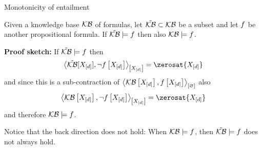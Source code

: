 \documentclass{beamer}
\begin{document}
    \begin{frame}{Monotonicity of entailment}

        \begin{theorem}
            Given a knowledge base $\mathcal{KB}$ of formulas, let $\tilde{\mathcal{KB}}\subset\mathcal{KB}$ be a subset and let $f$ be another propositional formula.
            If $\tilde{\mathcal{KB}}\models f$ then also $\mathcal{KB}\models f$.
        \end{theorem}

            {\bf Proof sketch:} If $\tilde{\mathcal{KB}}\models f$ then
        \begin{align*}
            \contractionof{\seckb[\shortcatvariables],\lnot\formulawith}{\shortcatvariables} = \zerosat{\shortcatvariables}
        \end{align*}
        and since this is a sub-contraction of $\left\langle \mathcal{KB}\left[X_{[d]}\right],f\left[X_{[d]}\right]\right\rangle_{\left[ \varnothing \right]}$ also
        \begin{align*}
            \contractionof{\kbwith,\lnot\formulawith}{\shortcatvariables} = \zerosat{\shortcatvariables}
        \end{align*}
        and therefore $\mathcal{KB}\models f$.

        Notice that the back direction does not hold:
        When $\mathcal{KB}\models f$, then $\tilde{\mathcal{KB}}\models f$ does not always hold.
    \end{frame}
\end{document}
